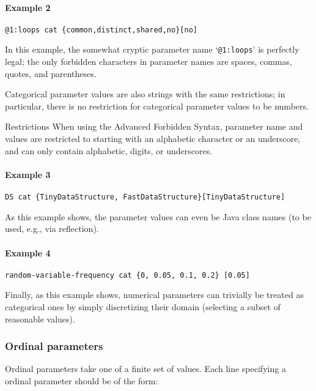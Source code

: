\documentclass[manual.tex]{subfiles}
\begin{document}
\paragraph{Example 2}
\begin{verbatim}
@1:loops cat {common,distinct,shared,no}[no]
\end{verbatim}
In this example, the somewhat cryptic parameter name `\texttt{@1:loops}' is perfectly legal; the only forbidden characters in parameter names are spaces, commas, quotes, and parentheses. 

%
Categorical parameter values are also strings with the same restrictions; in particular, there is no restriction for categorical parameter values to be numbers. 

\begin{bclogo}[logo=\bcattention, couleurBarre=red, noborder=true]{Restrictions}
When using the Advanced Forbidden Syntax, parameter name and values are restricted to starting with an alphabetic character or an underscore, and can only contain alphabetic, digits, or underscores.
\end{bclogo}

\paragraph{Example 3}
\begin{verbatim}
DS cat {TinyDataStructure, FastDataStructure}[TinyDataStructure]
\end{verbatim}
As this example shows, the parameter values can even be Java class names (to be used, e.g., via reflection).

\paragraph{Example 4}
\begin{verbatim}
random-variable-frequency cat {0, 0.05, 0.1, 0.2} [0.05]
\end{verbatim}
Finally, as this example shows, numerical parameters can trivially be treated as categorical ones by simply discretizing their domain (selecting a subset of reasonable values).

\subsubsection*{Ordinal parameters} \label{sec:ordinal-params}
Ordinal parameters take one of a finite set of values. Each line specifying a ordinal parameter should be of the form:
\end{document}
